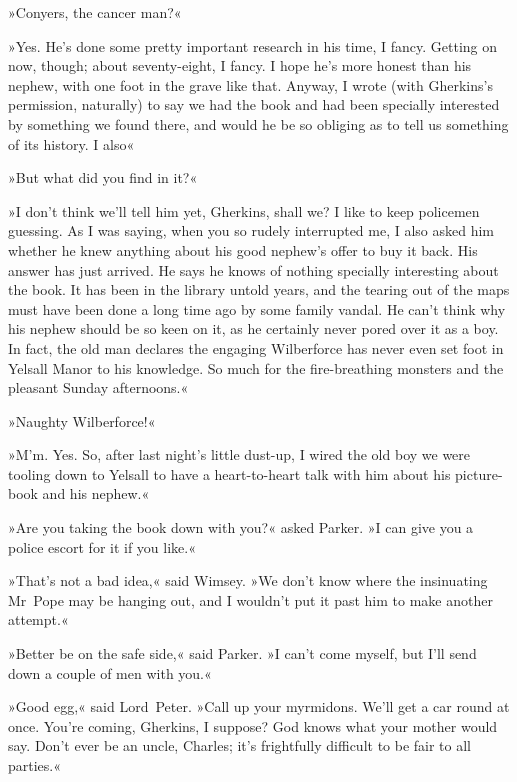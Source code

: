 »Conyers, the cancer man?«

»Yes. He's done some pretty important research in his time, I fancy. Getting on now, though; about seventy-eight, I fancy. I hope he's more honest than his nephew, with one foot in the grave like that. Anyway, I wrote (with Gherkins's permission, naturally) to say we had the book and had been specially interested by something we found there, and would he be so obliging as to tell us something of its history. I also\longdash«

»But what did you find in it?«

»I don't think we'll tell him yet, Gherkins, shall we? I like to keep policemen guessing. As I was saying, when you so rudely interrupted me, I also asked him whether he knew anything about his good nephew's offer to buy it back. His answer has just arrived. He says he knows of nothing specially interesting about the book. It has been in the library untold years, and the tearing out of the maps must have been done a long time ago by some family vandal. He can't think why his nephew should be so keen on it, as he certainly never pored over it as a boy. In fact, the old man declares the engaging Wilberforce has never even set foot in Yelsall Manor to his knowledge. So much for the fire-breathing monsters and the pleasant Sunday afternoons.«

»Naughty Wilberforce!«

»M'm. Yes. So, after last night's little dust-up, I wired the old boy we were tooling down to Yelsall to have a heart-to-heart talk with him about his picture-book and his nephew.«

»Are you taking the book down with you?« asked Parker. »I can give you a police escort for it if you like.«

»That's not a bad idea,« said Wimsey. »We don't know where the insinuating Mr~Pope may be hanging out, and I wouldn't put it past him to make another attempt.«

»Better be on the safe side,« said Parker. »I can't come myself, but I'll send down a couple of men with you.«

»Good egg,« said Lord~Peter. »Call up your myrmidons. We'll get a car round at once. You're coming, Gherkins, I suppose? God knows what your mother would say. Don't ever be an uncle, Charles; it's frightfully difficult to be fair to all parties.«

